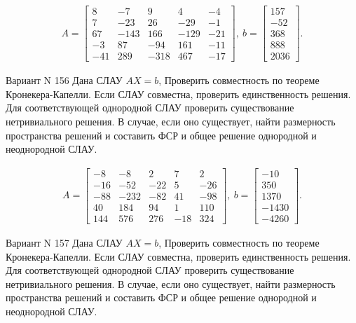 \documentclass[11pt]{report}
\begin{document}
\begin{align*}
 A = \left[\begin{matrix}8 & -7 & 9 & 4 & -4\\7 & -23 & 26 & -29 & -1\\67 & -143 & 166 & -129 & -21\\-3 & 87 & -94 & 161 & -11\\-41 & 289 & -318 & 467 & -17\end{matrix}\right],
\ b = \left[\begin{matrix}157\\-52\\368\\888\\2036\end{matrix}\right]. 
 \end{align*}

Вариант N 156
Дана СЛАУ $AX = b$,
Проверить совместность по теореме Кронекера-Капелли. Если СЛАУ совместна, проверить единственность решения.
Для соответствующей однородной СЛАУ проверить существование нетривиального решения. В случае, если оно существует,
найти размерность пространства решений и составить ФСР и общее решение однородной  и неоднородной СЛАУ.


\begin{align*}
 A = \left[\begin{matrix}-8 & -8 & 2 & 7 & 2\\-16 & -52 & -22 & 5 & -26\\-88 & -232 & -82 & 41 & -98\\40 & 184 & 94 & 1 & 110\\144 & 576 & 276 & -18 & 324\end{matrix}\right],
\ b = \left[\begin{matrix}-10\\350\\1370\\-1430\\-4260\end{matrix}\right]. 
 \end{align*}

Вариант N 157
Дана СЛАУ $AX = b$,
Проверить совместность по теореме Кронекера-Капелли. Если СЛАУ совместна, проверить единственность решения.
Для соответствующей однородной СЛАУ проверить существование нетривиального решения. В случае, если оно существует,
найти размерность пространства решений и составить ФСР и общее решение однородной  и неоднородной СЛАУ.
\end{document}
